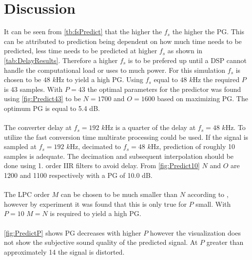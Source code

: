 \section{Discussion}
It can be seen from \autoref{tb:fsPredict} that the higher the $f_s$ the higher the PG. This can be attributed to prediction being dependent on how much time needs to be predicted, less time needs to be predicted at higher $f_s$ as shown in \autoref{tab:DelayResults}.  
Therefore a higher $f_s$ is to be prefered up until a DSP cannot handle the computational load or uses to much power. For this simulation $f_s$ is chosen to be $48$ $k$Hz to yield a high PG. 
Using $f_s$ equal to $48$ $k$Hz the required $P$ is 43 samples. With $P=43$ the optimal parameters for the predictor was found using \autoref{fig:Predict43} to be $N=1700$ and $O=1600$ based on maximizing PG. The optimum PG is equal to 5.4 dB. 
\\\\
The converter delay at $f_s=192$ $k$Hz is a quarter of the delay at $f_s=48$ $k$Hz. To utilize the fast conversion time multirate processing could be used. If the signal is sampled at $f_s=192$ $k$Hz, decimated to $f_s=48$ $k$Hz, prediction of roughly 10 samples is adequate. The decimation and subsequent interpolation should be done using 1. order IIR filters to avoid delay. From \autoref{fig:Predict10} $N$ and $O$ are 1200 and 1100 respectively with a PG of 10.0 dB. 
\\\\
The LPC order $M$ can be chosen to be much smaller than $N$ according to \cite{Speech}, however by experiment it was found that this is only true for $P$ small. With $P=10$ $M=N$ is required to yield a high PG. 
\\\\
\autoref{fig:PredictP} shows PG decreases with higher $P$ however the visualization does not show the subjective sound quality of the predicted signal. At $P$ greater than approximately 14 the signal is distorted.    
\\\\

